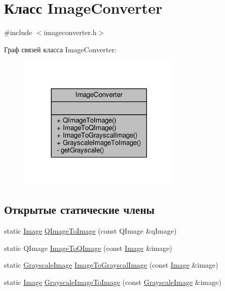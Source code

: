 \hypertarget{class_image_converter}{}\section{Класс Image\+Converter}
\label{class_image_converter}


{\ttfamily \#include $<$imageconverter.\+h$>$}



Граф связей класса Image\+Converter\+:
\nopagebreak
\begin{figure}[H]
\begin{center}
\leavevmode
\includegraphics[width=221pt]{d1/da6/class_image_converter__coll__graph}
\end{center}
\end{figure}
\subsection*{Открытые статические члены}
\begin{DoxyCompactItemize}
\item 
static \hyperlink{class_image}{Image} \hyperlink{class_image_converter_a5c0f28c5f9da5f2c64077e8dc7462a03}{Q\+Image\+To\+Image} (const Q\+Image \&q\+Image)
\item 
static Q\+Image \hyperlink{class_image_converter_a1d4ec9d93d250b7db9dc8fbf28c513cf}{Image\+To\+Q\+Image} (const \hyperlink{class_image}{Image} \&image)
\item 
static \hyperlink{class_grayscale_image}{Grayscale\+Image} \hyperlink{class_image_converter_a58b9e3e65e60d89986327f90bf305069}{Image\+To\+Grayscal\+Image} (const \hyperlink{class_image}{Image} \&image)
\item 
static \hyperlink{class_image}{Image} \hyperlink{class_image_converter_a43b58fb52b437bad20fb9dbb57f01067}{Grayscale\+Image\+To\+Image} (const \hyperlink{class_grayscale_image}{Grayscale\+Image} \&image)
\end{DoxyCompactItemize}
